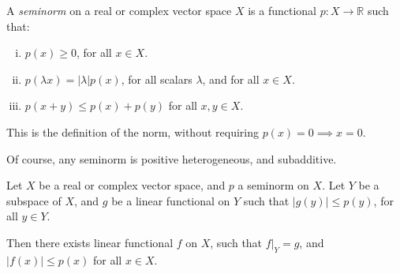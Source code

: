\documentclass[12pt]{article}
\begin{document}

\begin{definition}
	A \emph{seminorm} on a real or complex vector space $X$ is a functional $p : X \to \mathbb{R}$ such that:
	\begin{enumerate}[(i)]
		\item $p(x) \geq 0$, for all $x \in X$.
		\item $p(\lambda x) = |\lambda|p(x)$, for all scalars $\lambda$, and for all $x \in X$.
		\item $p(x + y) \leq p(x) + p(y)$ for all $x, y \in X$.
	\end{enumerate}
\end{definition}

This is the definition of the norm, without requiring $p(x) = 0 \implies x = 0$.

Of course, any seminorm is positive heterogeneous, and subadditive.

\begin{theorem}
	Let $X$ be a real or complex vector space, and $p$ a seminorm on $X$. Let $Y$ be a subspace of $X$, and $g$ be a linear functional on $Y$ such that $|g(y)| \leq p(y)$, for all $y \in Y$.

	Then there exists linear functional $f$ on $X$, such that $f|_Y = g$, and $|f(x)| \leq p(x)$ for all $x \in X$.
\end{theorem}
\end{document}
